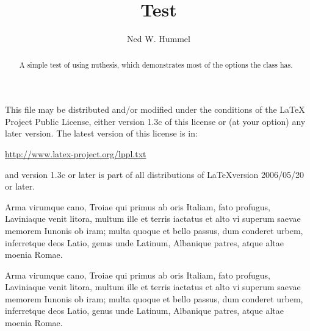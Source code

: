 \documentclass[ms,testing]{nuthesis}
\begin{document}
\frontmatter

\title{Test}
\author{Ned W. Hummel}
\major{\LaTeX}
\maketitle
\begin{abstract}
  A simple test of using \textsf{nuthesis}, which demonstrates most
  of the options the class has.
\end{abstract}

\begin{copyrightpage}
This file may be distributed and/or modified under the conditions of
the \LaTeX{} Project Public License, either version 1.3c of this license
or (at your option) any later version.  The latest version of this
license is in:
\begin{center}
   \url{http://www.latex-project.org/lppl.txt}
\end{center}
and version 1.3c or later is part of all distributions of \LaTeX version
2006/05/20 or later.
\end{copyrightpage}

\begin{dedication}
  Arma virumque cano, Troiae qui primus ab oris Italiam, fato
  profugus, Laviniaque venit litora, multum ille et terris iactatus et
  alto vi superum saevae memorem Iunonis ob iram; multa quoque et
  bello passus, dum conderet urbem, inferretque deos Latio, genus unde
  Latinum, Albanique patres, atque altae moenia Romae.
\end{dedication}

\begin{acknowledgments}
  Arma virumque cano, Troiae qui primus ab oris Italiam, fato
  profugus, Laviniaque venit litora, multum ille et terris iactatus et
  alto vi superum saevae memorem Iunonis ob iram; multa quoque et
  bello passus, dum conderet urbem, inferretque deos Latio, genus unde
  Latinum, Albanique patres, atque altae moenia Romae.
\end{acknowledgments}
\end{document}
